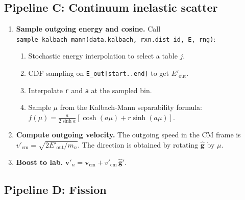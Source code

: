 \documentclass[11pt,a4paper]{article}
\begin{document}
\subsection{Pipeline C: Continuum inelastic scatter}

\begin{enumerate}[leftmargin=1.4em]
  \item \textbf{Sample outgoing energy and cosine.} Call \texttt{sample\_kalbach\_mann(data.kalbach, rxn.dist\_id, E, rng)}:
  \begin{enumerate}
    \item Stochastic energy interpolation to select a table $j$.
    \item CDF sampling on \texttt{E\_out[start..end]} to get $E'_\text{out}$.
    \item Interpolate \texttt{r} and \texttt{a} at the sampled bin.
    \item Sample $\mu$ from the Kalbach-Mann separability formula: $f(\mu) = \frac{a}{2\sinh a}\left[\cosh(a\mu) + r\sinh(a\mu)\right]$.
  \end{enumerate}
  \item \textbf{Compute outgoing velocity.} The outgoing speed in the CM frame is $v'_\text{cm} = \sqrt{2 E'_\text{out} / m_n}$. The direction is obtained by rotating $\hat{\mathbf{g}}$ by $\mu$.
  \item \textbf{Boost to lab.} $\mathbf{v}'_n = \mathbf{v}_\text{cm} + v'_\text{cm}\,\hat{\mathbf{g}}'$.
\end{enumerate}

\subsection{Pipeline D: Fission}
\end{document}
